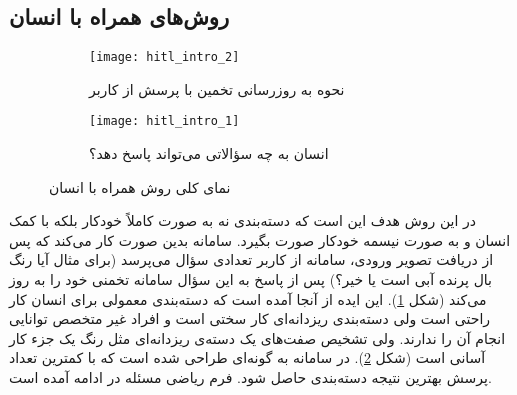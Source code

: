 \documentclass[11pt]{article}
\begin{document}

\subsection{روش‌های همراه با انسان}\label{sec:fg_class:hil}
\begin{figure}[t!]
	\centering
	\begin{subfigure}[h]{0.6\textwidth}
		\centering
		\texttt{[image: hitl\_intro\_2]}
		\caption{نحوه به روزرسانی تخمین با پرسش از کاربر}
		\label{fig:fg_class:hil:up}
	\end{subfigure}
	\begin{subfigure}[h]{0.6\textwidth}
		\centering
		\texttt{[image: hitl\_intro\_1]}
		\caption{انسان به چه سؤالاتی می‌تواند پاسخ دهد؟}
		\label{fig:fg_class:hil:int}
	\end{subfigure}
	\caption{نمای کلی روش همراه با انسان}
	\label{fig:fg_class:hil}
\end{figure}

در این روش هدف این است که دسته‌بندی نه به صورت کاملاً خودکار بلکه با کمک انسان و به صورت نیسمه خودکار صورت بگیرد. سامانه بدین صورت کار می‌کند که پس از دریافت تصویر ورودی، سامانه از کاربر تعدادی سؤال می‌پرسد (برای مثال آیا رنگ بال پرنده آبی است یا خیر؟) پس از پاسخ به این سؤال سامانه تخمنی خود را به روز می‌کند (شکل
\ref{fig:fg_class:hil:up}).
این ایده از آنجا آمده است که دسته‌بندی معمولی برای انسان کار راحتی است ولی دسته‌بندی ریزدانه‌ای کار سختی است و افراد غیر متخصص توانایی انجام آن را ندارند. ولی تشخیص صفت‌های یک دسته‌ی ریزدانه‌ای مثل رنگ یک جزء کار آسانی است (شکل
\ref{fig:fg_class:hil:int}). 
در
\cite{branson2010}
سامانه به گونه‌ای طراحی شده است که با کمترین تعداد پرسش بهترین نتیجه دسته‌بندی حاصل شود. فرم ریاضی مسئله در ادامه آمده است.
\end{document}
